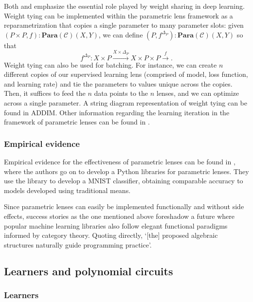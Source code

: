 \documentclass[12pt,a4paper,openright,twoside]{report}
\theoremstyle{plain}
\theoremstyle{definition}
\begin{document}
Both \cite{cruttwell2022categorical} and \cite{gavranovic2024fundamental} emphasize the essential role played by weight sharing in deep learning. Weight tying can be implemented within the parametric lens framework as a reparametrization that copies a single parameter to many parameter slots: given $(P \times P, f): \mathbf{Para}(\mathcal{C})(X,Y)$, we can define $(P, f^{\Delta_P}): \mathbf{Para}(\mathcal{C})(X,Y)$ so that
\[f^{\Delta_P}: X \times P \stackrel{X \times \Delta_P}{\longrightarrow} X \times P \times P \stackrel{f}{\longrightarrow}.\]
Weight tying can also be used for batching. For instance, we can create $n$ different copies of our supervised learning lens (comprised of model, loss function, and learning rate) and tie the parameters to values unique across the copies. Then, it suffices to feed the $n$ data points to the $n$ lenses, and we can optimize across a single parameter. A string diagram representation of weight tying can be found in ADDIM. Other information regarding the learning iteration in the framework of parametric lenses can be found in \cite{cruttwell2022categorical}.


\subsubsection{Empirical evidence}

Empirical evidence for the effectiveness of parametric lenses can be found in \cite{cruttwell2022categorical}, where the authors go on to develop a Python libraries for parametric lenses. They use the library to develop a MNIST classifier, obtaining comparable accuracy to models developed using traditional means. 


Since parametric lenses can easily be implemented functionally and without side effects, success stories as the one mentioned above foreshadow a future where popular machine learning libraries also follow elegant functional paradigms informed by category theory. Quoting  \cite{cruttwell2022categorical} directly, \lq[the] proposed algebraic structures naturally guide programming practice\rq.


\subsection{Learners and polynomial circuits}

\subsubsection{Learners}
\end{document}
